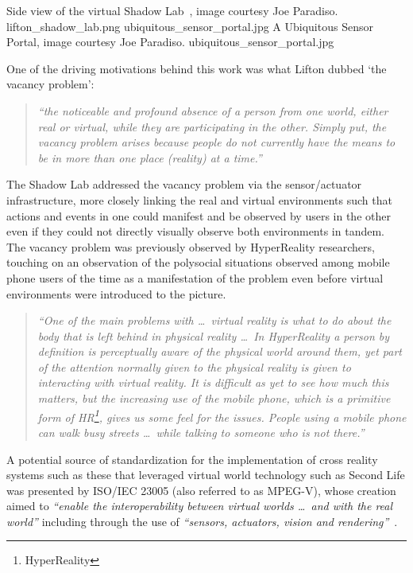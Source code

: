  {Side view of the virtual Shadow Lab~\cite{Lifton2007a}, image courtesy Joe Paradiso.} {lifton_shadow_lab.png}
       {ubiquitous_sensor_portal.jpg} {A Ubiquitous Sensor Portal\protect\footnotemark , image courtesy Joe Paradiso.} {ubiquitous_sensor_portal.jpg}


One of the driving motivations behind this work was what Lifton dubbed `the vacancy problem':

\begin{quote}
\textit{``the noticeable and profound absence of a person from one world, either real or virtual, while they are participating in the other. Simply put, the vacancy problem arises because people do not currently have the means to be in more than one place (reality) at a time.''}~\cite{Lifton2007a}
\end{quote}

The Shadow Lab addressed the vacancy problem via the sensor/actuator infrastructure, more closely linking the real and virtual environments such that actions and events in one could manifest and be observed by users in the other even if they could not directly visually observe both environments in tandem. The vacancy problem was previously observed by HyperReality researchers, touching on an observation of the polysocial situations observed among mobile phone users of the time as a manifestation of the problem even before virtual environments were introduced to the picture. %

\begin{quote}
	\textit{``One of the main problems with \ldots\ virtual reality is what to do about the body that is left behind in physical reality \ldots\ In HyperReality a person by definition is perceptually aware of the physical world around them, yet part of the attention normally given to the physical reality is given to interacting with virtual reality. It is difficult as yet to see how much this matters, but the increasing use of the mobile phone, which is a primitive form of HR\footnote{HyperReality}, gives us some feel for the issues. People using a mobile phone can walk busy streets \ldots\ while talking to someone who is not there.''}~\cite{Terashima2001}
\end{quote}

A potential source of standardization for the implementation of cross reality systems such as these that leveraged virtual world technology such as Second Life was presented by ISO/IEC 23005 (also referred to as MPEG-V), whose creation aimed to \textit{``enable the interoperability between virtual worlds \ldots\ and with the real world''} including through the use of \textit{``sensors, actuators, vision and rendering''}~\cite{InternationalOrganizationforStandardization2011}.

